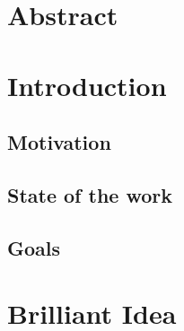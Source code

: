 









\usepackage{lipsum}


\makeTitlePage
\newpage
\pagestyle{headings}
\chapter*{Abstract}   %
\lipsum[1]
\cleardoublepage
\tableofcontents
\cleardoublepage

\chapter{Introduction}
\section{Motivation}
\lipsum[1-4]
\section{State of the work}
\lipsum[5-8]
\section{Goals}
\lipsum[9]


\chapter{Brilliant Idea}
\lipsum[10-15]

